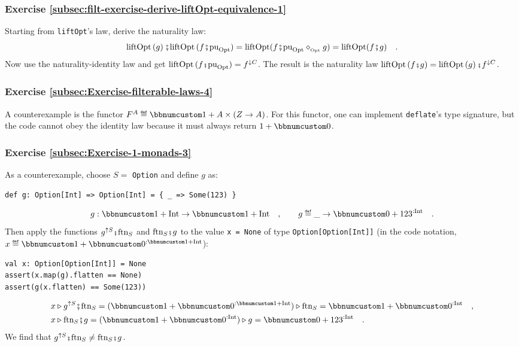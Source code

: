
\subsubsection*{Exercise \ref{subsec:filt-exercise-derive-liftOpt-equivalence-1}}

Starting from \lstinline!liftOpt!\textsf{'}s law, derive the naturality law:
\[
\text{liftOpt}\left(g\right)\bef\text{liftOpt}\,(f\bef\text{pu}_{\text{Opt}})=\text{liftOpt}(f\bef\text{pu}_{\text{Opt}}\diamond_{_{\text{Opt}}}g)=\text{liftOpt}(f\bef g)\quad.
\]
Now use the naturality-identity law and get $\text{liftOpt}\,(f\bef\text{pu}_{\text{Opt}})=f^{\downarrow C}$.
The result is the naturality law $\text{liftOpt}\left(f\bef g\right)=\text{liftOpt}\left(g\right)\bef f^{\downarrow C}$.

\subsubsection*{Exercise \ref{subsec:Exercise-filterable-laws-4}}

A counterexample is the functor $F^{A}\triangleq\bbnum 1+A\times\left(Z\rightarrow A\right)$.
For this functor, one can implement \lstinline!deflate!\textsf{'}s type signature,
but the code cannot obey the identity law because it must always return
$1+\bbnum 0$.


\subsubsection*{Exercise \ref{subsec:Exercise-1-monads-3}}

As a counterexample, choose $S=$ \lstinline!Option! and define $g$
as: 
\begin{lstlisting}
def g: Option[Int] => Option[Int] = { _ => Some(123) }
\end{lstlisting}
\[
g:\bbnum 1+\text{Int}\rightarrow\bbnum 1+\text{Int}\quad,\quad\quad g\triangleq\_\rightarrow\bbnum 0+123^{:\text{Int}}\quad.
\]
Then apply the functions $g^{\uparrow S}\bef\text{ftn}_{S}$ and $\text{ftn}_{S}\bef g$
to the value \lstinline!x = None! of type \lstinline!Option[Option[Int]]!
(in the code notation, $x\triangleq\bbnum 1+\bbnum 0^{:\bbnum 1+\text{Int}}$):
\begin{lstlisting}
val x: Option[Option[Int]] = None
assert(x.map(g).flatten == None)
assert(g(x.flatten) == Some(123))
\end{lstlisting}
\begin{align*}
 & x\triangleright g^{\uparrow S}\bef\text{ftn}_{S}=(\bbnum 1+\bbnum 0^{:\bbnum 1+\text{Int}})\triangleright\text{ftn}_{S}=\bbnum 1+\bbnum 0^{:\text{Int}}\quad,\\
 & x\triangleright\text{ftn}_{S}\bef g=(\bbnum 1+\bbnum 0^{:\text{Int}})\triangleright g=\bbnum 0+123^{:\text{Int}}\quad.
\end{align*}
We find that $g^{\uparrow S}\bef\text{ftn}_{S}\neq\text{ftn}_{S}\bef g$. 

